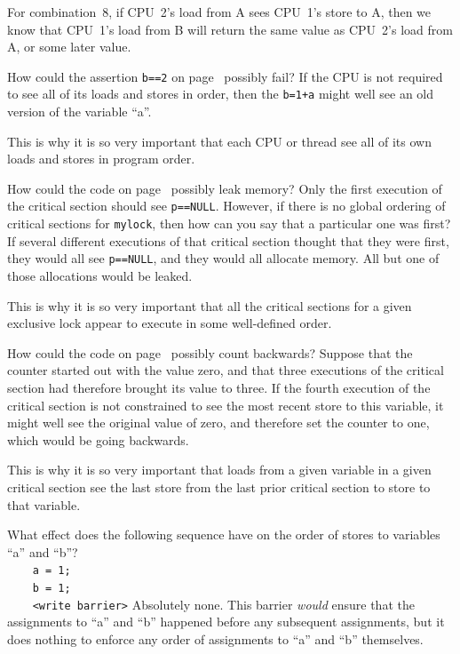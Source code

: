 \begin{enumerate}
	For combination~8, if CPU~2's load from A sees CPU~1's store
	to A, then we know that CPU~1's load from B will return the same
	value as CPU~2's load from A, or some later value.

\QuickQ{}
	How could the assertion {\tt b==2} on
	page~\pageref{codesample:advsync:What Can You Count On? 1}
	possibly fail?
\QuickA{}
	If the CPU is not required to see all of its loads and
	stores in order, then the {\tt b=1+a} might well see an
	old version of the variable ``a''.

	This is why it is so very important that each CPU or thread
	see all of its own loads and stores in program order.

\QuickQ{}
	How could the code on
	page~\pageref{codesample:advsync:What Can You Count On? 2}
	possibly leak memory?
\QuickA{}
	Only the first execution of the critical section should
	see {\tt p==NULL}.
	However, if there is no global ordering of critical sections for
	{\tt mylock}, then how can you say that a particular one was
	first?
	If several different executions of that critical section thought
	that they were first, they would all see {\tt p==NULL}, and
	they would all allocate memory.
	All but one of those allocations would be leaked.

	This is why it is so very important that all the critical sections
	for a given exclusive lock appear to execute in some well-defined
	order.

\QuickQ{}
	How could the code on
	page~\pageref{codesample:advsync:What Can You Count On? 2}
	possibly count backwards?
\QuickA{}
	Suppose that the counter started out with the value zero,
	and that three executions of the critical section had therefore
	brought its value to three.
	If the fourth execution of the critical section is not constrained
	to see the most recent store to this variable, it might well see
	the original value of zero, and therefore set the counter to
	one, which would be going backwards.

	This is why it is so very important that loads from a given variable
	in a given critical
	section see the last store from the last prior critical section to
	store to that variable.

\QuickQ{}
	What effect does the following sequence have on the
	order of stores to variables ``a'' and ``b''? \\
	{\tt ~~~~a = 1;} \\
	{\tt ~~~~b = 1;} \\
	{\tt ~~~~<write barrier>}
\QuickA{}
	Absolutely none.  This barrier {\em would} ensure that the
	assignments to ``a'' and ``b'' happened before any subsequent
	assignments, but it does nothing to enforce any order of
	assignments to ``a'' and ``b'' themselves.


\end{enumerate}
